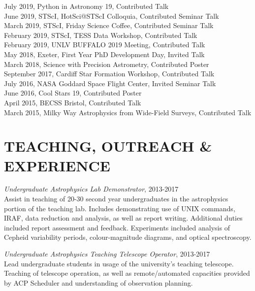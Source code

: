 \documentclass[letter, margin, 10pt]{res} %
\begin{document}
\begin{resume}
July 2019, Python in Astronomy 19, Contributed Talk\\
June 2019, STScI, HotSci@STScI Colloquia, Contributed Seminar Talk\\
March 2019, STScI, Friday Science Coffee, Contributed Seminar Talk\\
February 2019, STScI, TESS Data Workshop, Contributed Talk\\
February 2019, UNLV BUFFALO 2019 Meeting, Contributed Talk\\
May 2018, Exeter, First Year PhD Development Day, Invited Talk\\
March 2018, Science with Precision Astrometry, Contributed Poster\\
September 2017, Cardiff Star Formation Workshop, Contributed Talk\\
July 2016, NASA Goddard Space Flight Center, Invited Seminar Talk\\
June 2016, Cool Stars 19, Contributed Poster\\
April 2015, BECSS Bristol, Contributed Talk\\
March 2015, Milky Way Astrophysics from Wide-Field Surveys, Contributed Talk

 
\section{TEACHING, OUTREACH \& EXPERIENCE}

{\sl Undergraduate Astrophysics Lab Demonstrator}, 2013-2017\\
Assist in teaching of 20-30 second year undergraduates in the astrophysics portion of the teaching lab. Includes demonstrating use of UNIX commands, IRAF, data reduction and analysis, as well as report writing. Additional duties included report assessment and feedback. Experiments included analysis of Cepheid variability periods, colour-magnitude diagrams, and optical spectroscopy.

{\sl Undergraduate Astrophysics Teaching Telescope Operator}, 2013-2017\\
Lead undergraduate students in usage of the university's teaching telescope. Teaching of telescope operation, as well as remote/automated capacities provided by ACP Scheduler and understanding of observation planning.


\end{resume}
\end{document}
